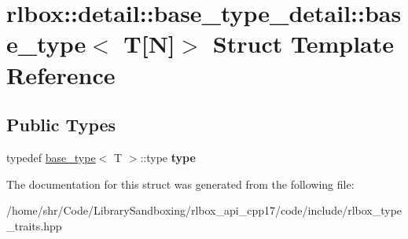 \hypertarget{structrlbox_1_1detail_1_1base__type__detail_1_1base__type_3_01T[N]_4}{}\section{rlbox\+:\+:detail\+:\+:base\+\_\+type\+\_\+detail\+:\+:base\+\_\+type$<$ T\mbox{[}N\mbox{]}$>$ Struct Template Reference}
\label{structrlbox_1_1detail_1_1base__type__detail_1_1base__type_3_01T[N]_4}
\subsection*{Public Types}
\begin{DoxyCompactItemize}
\item 
\mbox{\label{structrlbox_1_1detail_1_1base__type__detail_1_1base__type_3_01T[N]_4_ac0c6aec36bdd840ebb83930c497f7e5f}} 
typedef \hyperlink{structrlbox_1_1detail_1_1base__type__detail_1_1base__type}{base\+\_\+type}$<$ T $>$\+::type {\bfseries type}
\end{DoxyCompactItemize}


The documentation for this struct was generated from the following file\+:\begin{DoxyCompactItemize}
\item 
/home/shr/\+Code/\+Library\+Sandboxing/rlbox\+\_\+api\+\_\+cpp17/code/include/rlbox\+\_\+type\+\_\+traits.\+hpp\end{DoxyCompactItemize}

